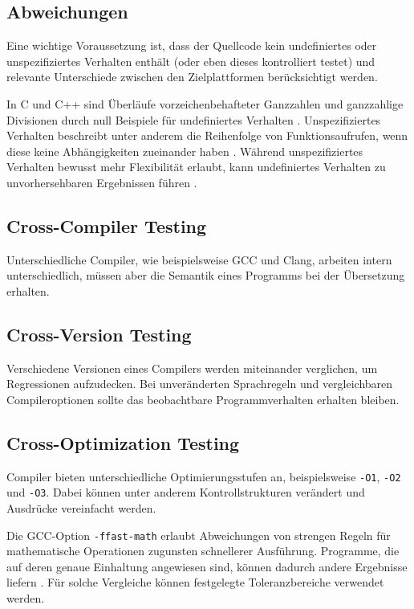\documentclass[11pt,a4paper]{article}
\begin{document}
\subsection{Abweichungen}

Eine wichtige Voraussetzung ist, dass der Quellcode kein undefiniertes oder unspezifiziertes Verhalten enthält (oder eben dieses kontrolliert testet) und relevante Unterschiede zwischen den Zielplattformen berücksichtigt werden.

In C und C++ sind Überläufe vorzeichenbehafteter Ganzzahlen und ganzzahlige Divisionen durch null Beispiele für undefiniertes Verhalten \parencite{cppreference_arithmetic}. Unspezifiziertes Verhalten beschreibt unter anderem die Reihenfolge von Funktionsaufrufen, wenn diese keine Abhängigkeiten zueinander haben \parencite{cppreference_evaluation_order}. Während unspezifiziertes Verhalten bewusst mehr Flexibilität erlaubt, kann undefiniertes Verhalten zu unvorhersehbaren Ergebnissen führen \parencite{cppreference_undefined_behavior}.

\subsection{Cross-Compiler Testing}

Unterschiedliche Compiler, wie beispielsweise GCC und Clang, arbeiten intern
unterschiedlich, müssen aber die Semantik eines Programms bei der Übersetzung
erhalten.

\subsection{Cross-Version Testing}

Verschiedene Versionen eines Compilers werden miteinander verglichen, um
Regressionen aufzudecken. Bei unveränderten Sprachregeln und vergleichbaren
Compileroptionen sollte das beobachtbare Programmverhalten erhalten bleiben.

\subsection{Cross-Optimization Testing}

Compiler bieten unterschiedliche Optimierungsstufen an, beispielsweise
\texttt{-O1}, \texttt{-O2} und \texttt{-O3}. Dabei können unter anderem
Kontrollstrukturen verändert und Ausdrücke vereinfacht werden.

Die GCC-Option \texttt{-ffast-math} erlaubt Abweichungen von strengen
Regeln für mathematische Operationen zugunsten schnellerer Ausführung.
Programme, die auf deren genaue Einhaltung angewiesen sind, können dadurch
andere Ergebnisse liefern \parencite{gcc_optimize_options}.
Für solche Vergleiche können festgelegte Toleranzbereiche verwendet werden.
\end{document}
